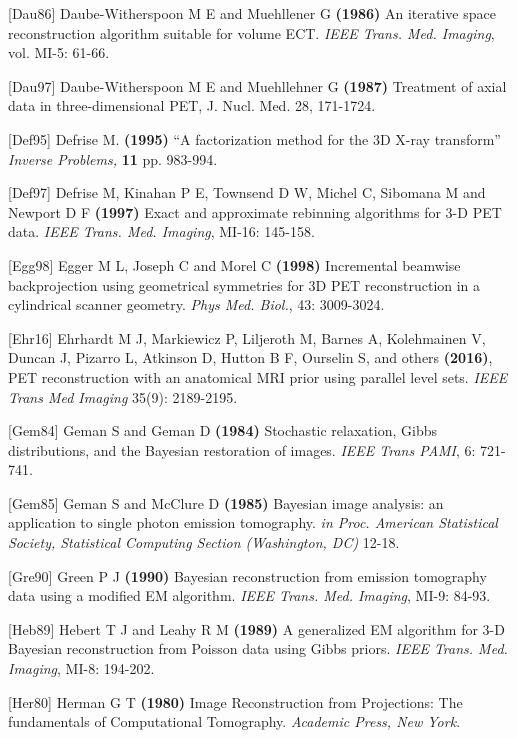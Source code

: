 \documentclass{article}
\begin{document}
{{{{{{{[}Dau86] Daube-Witherspoon M E and Muehllener G \textbf{(1986)} An 
iterative space reconstruction algorithm suitable for volume 
ECT. \textit{IEEE Trans. Med. Imaging}, vol. MI-5: 61-66.

{[}Dau97] Daube-Witherspoon M E and Muehllehner G \textbf{(1987)} 
Treatment of axial data in three-dimensional PET, 
J. Nucl. Med. 28, 171-1724.

{[}Def95] Defrise M. \textbf{(1995)} ``A factorization method for the 
3D X-ray transform'' \textit{Inverse Problems,} \textbf{11} pp. 983-994.


{[}Def97] Defrise M, Kinahan P E, Townsend D W, Michel C, Sibomana 
M and Newport D F \textbf{(1997)} Exact and approximate rebinning 
algorithms for 3-D PET data. \textit{IEEE Trans. Med. Imaging}, MI-16: 
145-158.

{[}Egg98] Egger M L, Joseph C and Morel C \textbf{(1998)} Incremental 
beamwise backprojection using geometrical symmetries for 3D PET 
reconstruction in a cylindrical scanner geometry. \textit{Phys Med. 
Biol.}, 43: 3009-3024.

{[}Ehr16{]} Ehrhardt M J, Markiewicz P, Liljeroth M, Barnes A, Kolehmainen V, Duncan J, Pizarro L, Atkinson D, Hutton B F, Ourselin S, and others \textbf{(2016)}, 
PET reconstruction with an anatomical MRI prior using parallel level sets. \textit { IEEE Trans Med Imaging } 35(9): 2189-2195.

{[}Gem84] Geman S and Geman D \textbf{(1984)} Stochastic relaxation, 
Gibbs distributions, and the Bayesian restoration of images. \textit{IEEE 
Trans PAMI}, 6: 721-741.

{[}Gem85] Geman S and McClure D \textbf{(1985)} Bayesian image analysis: 
an application to single photon emission tomography. \textit{in Proc. 
American Statistical Society, Statistical Computing Section (Washington, 
DC)} 12-18.


 {[}Gre90] Green P J \textbf{(1990)} Bayesian reconstruction from emission 
tomography data using a modified EM algorithm. \textit{IEEE Trans. 
Med. Imaging}, MI-9: 84-93.


{[}Heb89] Hebert T J and Leahy R M \textbf{(1989)} A generalized EM 
algorithm for 3-D Bayesian reconstruction from Poisson data using 
Gibbs priors. \textit{IEEE Trans. Med. Imaging}, MI-8: 194-202.


{[}Her80] Herman G T \textbf{(1980)} Image Reconstruction from Projections: 
The fundamentals of Computational Tomography. \textit{Academic Press, 
New York}.

}}}}}}
\end{document}
